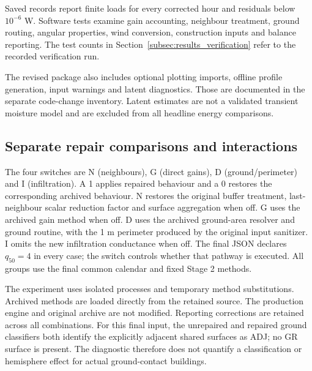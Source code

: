 Saved records report finite loads for every corrected hour and residuals below $10^{-6}$ W. Software tests examine gain accounting, neighbour treatment, ground routing, angular properties, wind conversion, construction inputs and balance reporting. The test counts in Section~\ref{subsec:results_verification} refer to the recorded verification run.

The revised package also includes optional plotting imports, offline profile generation, input warnings and latent diagnostics. Those are documented in the separate code-change inventory. Latent estimates are not a validated transient moisture model and are excluded from all headline energy comparisons.


\subsection{Separate repair comparisons and interactions}
\label{app:attribution}
The four switches are N (neighbours), G (direct gains), D (ground/perimeter) and I (infiltration). A 1 applies repaired behaviour and a 0 restores the corresponding archived behaviour. N restores the original buffer treatment, last-neighbour scalar reduction factor and surface aggregation when off. G uses the archived gain method when off. D uses the archived ground-area resolver and ground routine, with the 1 m perimeter produced by the original input sanitizer. I omits the new infiltration conductance when off. The final JSON declares $q_{50}=4$ in every case; the switch controls whether that pathway is executed. All groups use the final common calendar and fixed Stage 2 methods.

The experiment uses isolated processes and temporary method substitutions. Archived methods are loaded directly from the retained source. The production engine and original archive are not modified. Reporting corrections are retained across all combinations. For this final input, the unrepaired and repaired ground classifiers both identify the explicitly adjacent shared surfaces as ADJ; no GR surface is present. The diagnostic therefore does not quantify a classification or hemisphere effect for actual ground-contact buildings.

